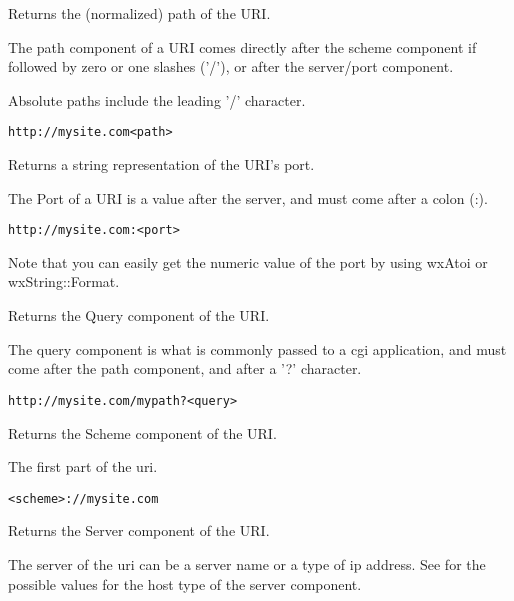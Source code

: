 \label{wxurigetpath}


Returns the (normalized) path of the URI.

The path component of a URI comes
directly after the scheme component
if followed by zero or one slashes ('/'),
or after the server/port component.

Absolute paths include the leading '/'
character.

\tt{http://mysite.com<path>}

\label{wxurigetport}


Returns a string representation of the URI's port.

The Port of a URI is a value after the server, and 
must come after a colon (:).

\tt{http://mysite.com:<port>}

Note that you can easily get the numeric value of the port
by using wxAtoi or wxString::Format.

\label{wxurigetquery}


Returns the Query component of the URI.

The query component is what is commonly passed to a 
cgi application, and must come after the path component,
and after a '?' character.

\tt{http://mysite.com/mypath?<query>}


\label{wxurigetscheme}


Returns the Scheme component of the URI.

The first part of the uri.

\tt{<scheme>://mysite.com}


\label{wxurigetserver}


Returns the Server component of the URI.

The server of the uri can be a server name or 
a type of ip address.  See
 for the
possible values for the host type of the 
server component.


